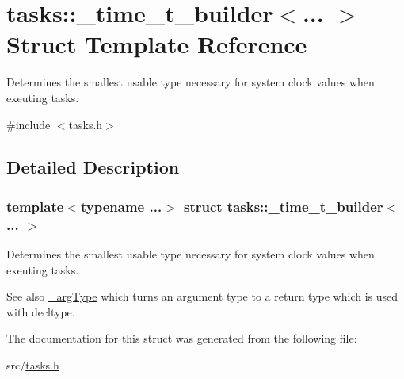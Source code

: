 \hypertarget{structtasks_1_1__time__t__builder}{}\section{tasks\+:\+:\+\_\+time\+\_\+t\+\_\+builder$<$... $>$ Struct Template Reference}
\label{structtasks_1_1__time__t__builder}


Determines the smallest usable type necessary for system clock values when exeuting tasks.  




{\ttfamily \#include $<$tasks.\+h$>$}



\subsection{Detailed Description}
\subsubsection*{template$<$typename ...$>$\newline
struct tasks\+::\+\_\+time\+\_\+t\+\_\+builder$<$... $>$}

Determines the smallest usable type necessary for system clock values when exeuting tasks. 

\begin{DoxySeeAlso}{See also}
\hyperlink{namespacetasks_ac4a797a86584958bef0b67616a38c8ae}{\+\_\+arg\+Type} which turns an argument type to a return type which is used with decltype. 
\end{DoxySeeAlso}


The documentation for this struct was generated from the following file\+:\begin{DoxyCompactItemize}
\item 
src/\hyperlink{tasks_8h}{tasks.\+h}\end{DoxyCompactItemize}
